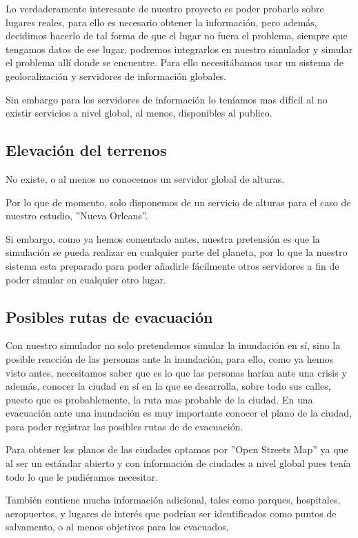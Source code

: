 Lo verdaderamente interesante de nuestro proyecto es poder probarlo sobre
lugares reales, para ello es necesario obtener la información, pero además,
decidimos hacerlo de tal forma de que el lugar no fuera el problema, siempre que
tengamos datos de ese lugar, podremos integrarlos en nuestro simulador y simular
el problema allí donde se encuentre. Para ello necesitábamos usar un sistema de
geolocalización y servidores de información globales.

Sin embargo para los servidores de información lo teníamos mas difícil al no
existir servicios a nivel global, al menos, disponibles al publico.

\subsection*{Elevación del terrenos}

No existe, o al menos no conocemos un servidor global de alturas.

Por lo que de momento, solo disponemos de un servicio de alturas para el caso de
nuestro estudio, ''Nueva Orleans''.

Si embargo, como ya hemos comentado antes, nuestra pretensión es que la
simulación se pueda realizar en cualquier parte del planeta, por lo que la
nuestro sistema esta preparado para poder añadirle fácilmente otros servidores a
fin de poder simular en cualquier otro lugar. 

\subsection*{Posibles rutas de evacuación}

Con nuestro simulador no solo pretendemos simular la inundación en sí, sino la
posible reacción de las personas ante la inundación, para ello, como ya hemos
visto antes, necesitamos saber que es lo que las personas harían ante una
crisis y además, conocer la ciudad en sí en la que se desarrolla, sobre todo sus
calles, puesto que es probablemente, la ruta mas probable de la ciudad.
En una evacuación ante una inundación es muy importante conocer el plano de la
ciudad, para poder registrar las posibles rutas de de evacuación.

Para obtener los planos de las ciudades optamos por ''Open Streets Map'' ya que
al ser un estándar abierto y con información de ciudades a nivel global pues
tenía todo lo que le pudiéramos necesitar. 

También contiene mucha información adicional, tales como parques, hospitales,
aeropuertos, y lugares de interés que podrían ser identificados como puntos de
salvamento, o al menos objetivos para los evacuados.

